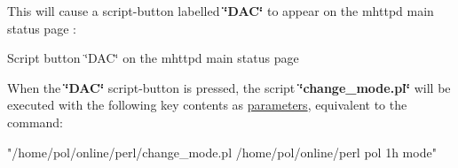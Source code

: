 This will cause a script-\/button labelled {\bfseries \char`\"{}DAC\char`\"{}} to appear on the mhttpd main status page : \par
 \begin{center} Script button \char`\"{}DAC\char`\"{} on the mhttpd main status page  \end{center} \par


When the {\bfseries \char`\"{}DAC\char`\"{}} script-\/button is pressed, the script {\bfseries \char`\"{}change\_\-mode.pl\char`\"{}} will be executed with the following key contents as \hyperlink{structparameters}{parameters}, equivalent to the command: 
\begin{DoxyCode}
  "/home/pol/online/perl/change_mode.pl  /home/pol/online/perl pol 1h mode"
\end{DoxyCode}
 \par


